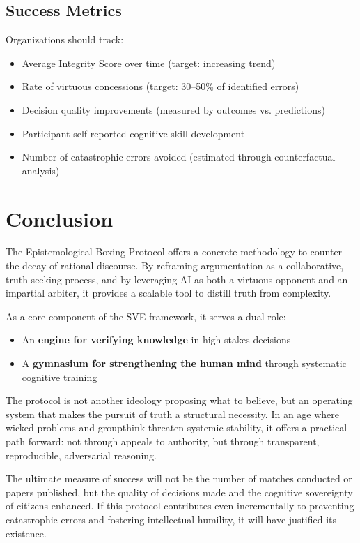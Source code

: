 \documentclass[11pt,a4paper]{article}
\begin{document}
\subsection{Success Metrics}

Organizations should track:
\begin{itemize}[nosep]
    \item Average Integrity Score over time (target: increasing trend)
    \item Rate of virtuous concessions (target: 30--50\% of identified errors)
    \item Decision quality improvements (measured by outcomes vs. predictions)
    \item Participant self-reported cognitive skill development
    \item Number of catastrophic errors avoided (estimated through counterfactual analysis)
\end{itemize}

\section{Conclusion}

The Epistemological Boxing Protocol offers a concrete methodology to counter the decay of rational discourse. By reframing argumentation as a collaborative, truth-seeking process, and by leveraging AI as both a virtuous opponent and an impartial arbiter, it provides a scalable tool to distill truth from complexity.

As a core component of the SVE framework, it serves a dual role:
\begin{itemize}[nosep]
    \item An \textbf{engine for verifying knowledge} in high-stakes decisions
    \item A \textbf{gymnasium for strengthening the human mind} through systematic cognitive training
\end{itemize}

The protocol is not another ideology proposing what to believe, but an operating system that makes the pursuit of truth a structural necessity. In an age where wicked problems and groupthink threaten systemic stability, it offers a practical path forward: not through appeals to authority, but through transparent, reproducible, adversarial reasoning.

The ultimate measure of success will not be the number of matches conducted or papers published, but the quality of decisions made and the cognitive sovereignty of citizens enhanced. If this protocol contributes even incrementally to preventing catastrophic errors and fostering intellectual humility, it will have justified its existence.
\end{document}
